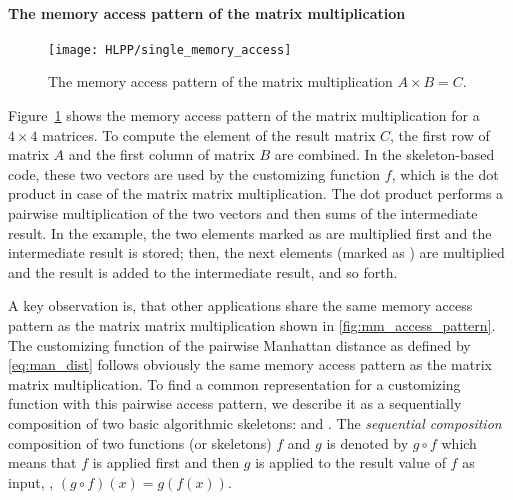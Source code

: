 \paragraph{The memory access pattern of the matrix multiplication}
\begin{figure}[t]
  \centering
  \texttt{[image: HLPP/single\_memory\_access]}
  \caption{The memory access pattern of the matrix multiplication $A\times B = C$.}
  \label{fig:mm_access_pattern}
\end{figure}
Figure~\ref{fig:mm_access_pattern} shows the memory access pattern of the matrix multiplication for a $4\times 4$ matrices.
To compute the element  of the result matrix $C$, the first row of matrix $A$ and the first column of matrix $B$ are combined.
In the skeleton-based code, these two vectors are used by the customizing function $f$, which is the dot product in case of the matrix matrix multiplication.
The dot product performs a pairwise multiplication of the two vectors and then sums of the intermediate result.
In the example, the two elements marked as  are multiplied first and the intermediate result is stored;
then, the next elements (marked as ) are multiplied and the result is added to the intermediate result, and so forth.

A key observation is, that other applications share the same memory access pattern as the matrix matrix multiplication shown in \autoref{fig:mm_access_pattern}.
The customizing function of the pairwise Manhattan distance as defined by \autoref{eq:man_dist} follows obviously the same memory access pattern as the matrix matrix multiplication.
To find a common representation for a customizing function with this pairwise access pattern, we describe it as a sequentially composition of two basic algorithmic skeletons: \zip and \reduce.
The \emph{sequential composition} composition of two functions (or skeletons) $f$ and $g$ is denoted by $g \circ f$ which means that $f$ is applied first and then $g$ is applied to the result value of $f$ as input, \ie, $(g\circ f)(x) = g(f(x))$.

